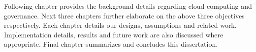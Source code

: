 Following chapter provides the background details regarding cloud computing and governance.
Next three chapters further elaborate on the above three objectives respectively. 
Each chapter details our designs, assumptions and related work. Implementation details,
results and future work are also discussed where appropriate. Final chapter
summarizes and concludes this dissertation.